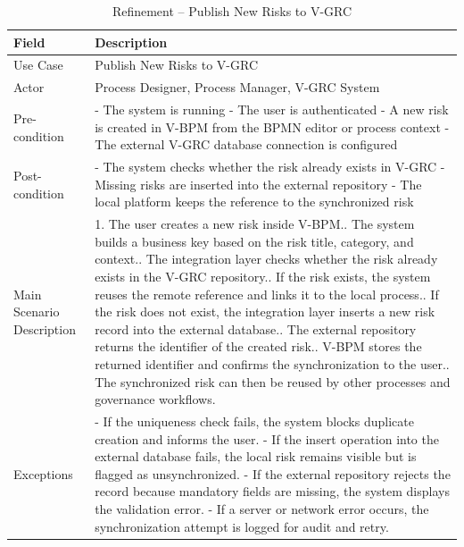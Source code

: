 \begin{table}[H]
\centering
\caption{Refinement -- Publish New Risks to V-GRC}
\label{tab:refinement-grc-push}
\begin{tabular}{|p{3cm}|p{12cm}|}
\hline
\textbf{Field} & \textbf{Description} \\
\hline
Use Case & Publish New Risks to V-GRC \\
\hline
Actor & Process Designer, Process Manager, V-GRC System \\
\hline
Pre-condition &
- The system is running\newline
- The user is authenticated\newline
- A new risk is created in V-BPM from the BPMN editor or process context\newline
- The external V-GRC database connection is configured \\
\hline
Post-condition &
- The system checks whether the risk already exists in V-GRC\newline
- Missing risks are inserted into the external repository\newline
- The local platform keeps the reference to the synchronized risk \\
\hline
Main Scenario Description &
1. The user creates a new risk inside V-BPM.\newline
2. The system builds a business key based on the risk title, category, and context.\newline
3. The integration layer checks whether the risk already exists in the V-GRC repository.\newline
4. If the risk exists, the system reuses the remote reference and links it to the local process.\newline
5. If the risk does not exist, the integration layer inserts a new risk record into the external database.\newline
6. The external repository returns the identifier of the created risk.\newline
7. V-BPM stores the returned identifier and confirms the synchronization to the user.\newline
8. The synchronized risk can then be reused by other processes and governance workflows. \\
\hline
Exceptions &
- If the uniqueness check fails, the system blocks duplicate creation and informs the user.\newline
- If the insert operation into the external database fails, the local risk remains visible but is flagged as unsynchronized.\newline
- If the external repository rejects the record because mandatory fields are missing, the system displays the validation error.\newline
- If a server or network error occurs, the synchronization attempt is logged for audit and retry. \\
\hline
\end{tabular}
\end{table}

